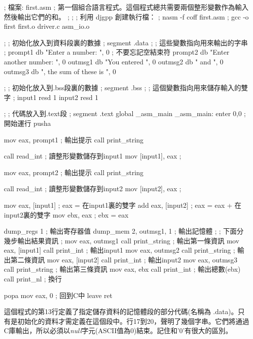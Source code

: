 \begin{AsmCodeListing}[label=first.asm]
; 檔案: first.asm
; 第一個組合語言程式。這個程式總共需要兩個整形變數作為輸入然後輸出它們的和。
;
;
; 利用 djgpp 創建執行檔：
; nasm -f coff first.asm
; gcc -o first first.o driver.c asm_io.o

;
; 初始化放入到資料段裏的數據
;
segment .data
;
; 這些變數指向用來輸出的字串
;
prompt1 db    "Enter a number: ", 0       ; 不要忘記空結束符
prompt2 db    "Enter another number: ", 0
outmsg1 db    "You entered ", 0
outmsg2 db    " and ", 0
outmsg3 db    ", the sum of these is ", 0

;
; 初始化放入到.bss段裏的數據
;
segment .bss
;
; 這個變數指向用來儲存輸入的雙字
;
input1  resd 1
input2  resd 1

;
; 代碼放入到.text段
;
segment .text
        global  _asm_main
_asm_main:
        enter   0,0               ; 開始運行
        pusha

        mov     eax, prompt1      ; 輸出提示
        call    print_string

        call    read_int          ; 讀整形變數儲存到input1
        mov     [input1], eax     ;

        mov     eax, prompt2      ; 輸出提示
        call    print_string

        call    read_int          ; 讀整形變數儲存到input2
        mov     [input2], eax     ;

        mov     eax, [input1]     ; eax = 在input1裏的雙字
        add     eax, [input2]     ; eax = eax + 在input2裏的雙字
        mov     ebx, eax          ; ebx = eax

        dump_regs 1                ; 輸出寄存器值
        dump_mem  2, outmsg1, 1    ; 輸出記憶體
;
; 下面分幾步輸出結果資訊
;
        mov     eax, outmsg1
        call    print_string      ; 輸出第一條資訊
        mov     eax, [input1]
        call    print_int         ; 輸出input1
        mov     eax, outmsg2
        call    print_string      ; 輸出第二條資訊
        mov     eax, [input2]
        call    print_int         ; 輸出input2
        mov     eax, outmsg3
        call    print_string      ; 輸出第三條資訊
        mov     eax, ebx
        call    print_int         ; 輸出總數(ebx)
        call    print_nl          ; 換行

        popa
        mov     eax, 0            ; 回到C中
        leave
        ret
\end{AsmCodeListing}

這個程式的第13行定義了指定儲存資料的記憶體段的部分代碼(名稱為{\code
.data})。只有是初始化的資料才需定義在這個段中。行17到20，聲明了幾個字串。它們將通過C庫輸出，所以必須以\emph{null}字元(ASCII值為0)結束。記住{}和{\code '0'}有很大的區別。

